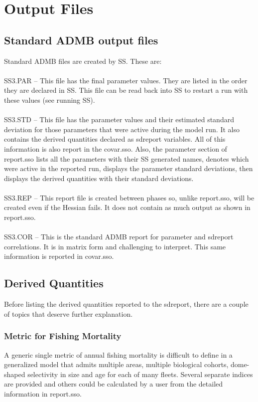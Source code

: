\section{Output Files}
\subsection{Standard ADMB output files}
Standard ADMB files are created by SS.  These are:\\
\\
SS3.PAR – This file has the final parameter values.  They are listed in the order they are declared in SS.  This file can be read back into SS to restart a run with these values (see running SS).\\
\\
SS3.STD – This file has the parameter values and their estimated standard deviation for those parameters that were active during the model run.  It also contains the derived quantities declared as sdreport variables.  All of this information is also report in the covar.sso.  Also, the parameter section of report.sso lists all the parameters with their SS generated names, denotes which were active in the reported run, displays the parameter standard deviations, then displays the derived quantities with their standard deviations.\\
\\
SS3.REP – This report file is created between phases so, unlike report.sso, will be created even if the Hessian fails.  It does not contain as much output as shown in report.sso.\\
\\
SS3.COR – This is the standard ADMB report for parameter and sdreport correlations.  It is in matrix form and challenging to interpret.  This same information is reported in covar.sso.

\subsection{Derived Quantities}
Before listing the derived quantities reported to the sdreport, there are a couple of topics that deserve further explanation.

\subsubsection{Metric for Fishing Mortality}
A generic single metric of annual fishing mortality is difficult to define in a generalized model that admits multiple areas, multiple biological cohorts, dome-shaped selectivity in size and age for each of many fleets.  Several separate indices are provided and others could be calculated by a user from the detailed information in report.sso.

